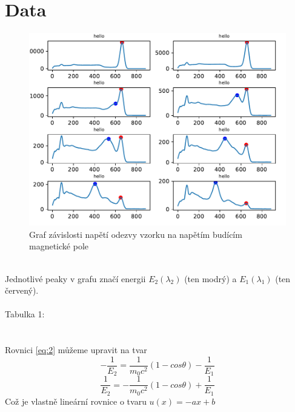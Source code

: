 \documentclass{article}
\begin{document}
\section{}
\newpage
\section{Data}
\begin{figure}[h]
  \hspace*{-1em}
  \includegraphics[scale=0.8]{figs/fig1.pdf}
  \caption{Graf závislosti napětí odezvy vzorku na napětím budícím magnetické pole}
\end{figure}
\\
Jednotlivé peaky v grafu značí energii $E_{2}(\lambda_{2})$ (ten modrý) a $E_{1}(\lambda_{1})$ (ten červený).\\
\\
\footnotesize{Tabulka 1:}\\

\\
\vspace{1em}
\\
\newpage
Rovnici \ref{eq:2} můžeme upravit na tvar\\
$$- \frac{1}{E_{2}} = \frac{1}{m_{0}c^{2}} (1-cos\theta) - \frac{1}{E_{1}}$$
$$\frac{1}{E_{2}} = -\frac{1}{m_{0}c^{2}} (1-cos\theta) + \frac{1}{E_{1}}$$
Což je vlastně lineární rovnice o tvaru $u(x) = -ax + b$
\end{document}

